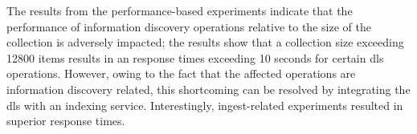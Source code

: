 \begin{enumerate}[label=\roman*]
 The results from the performance-based experiments indicate that the performance of information discovery operations relative to the size of the collection is adversely impacted; the results show that a collection size exceeding \num{12800} items results in an response times exceeding 10 seconds for certain \gls{dls} operations. However, owing to the fact that the affected operations are information discovery related, this shortcoming can be resolved by integrating the \gls{dls} with an indexing service. Interestingly, ingest-related experiments resulted in superior response times.
 
\end{enumerate}

